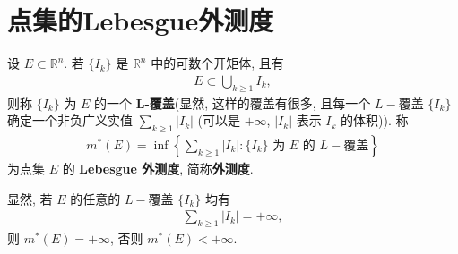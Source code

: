 \documentclass[../../main.tex]{subfiles}
\begin{document}
\section{点集的Lebesgue外测度}

\begin{definition}[Lebesgue外测度]
设 \(E \subset \mathbb{R}^n\). 若 \(\{I_k\}\) 是 \(\mathbb{R}^n\) 中的可数个开矩体, 且有
\begin{align*}
E \subset \bigcup_{k \geq 1} I_k,
\end{align*}
则称 \(\{I_k\}\) 为 \(E\) 的一个 \textbf{L-覆盖}(显然, 这样的覆盖有很多, 且每一个 \(L -\)覆盖 \(\{I_k\}\) 确定一个非负广义实值 \(\sum_{k \geq 1} |I_k|\) (可以是 \(+ \infty\), \(|I_k|\) 表示 \(I_k\) 的体积)). 称
\begin{align*}
m^*(E) = \inf \left\{ \sum_{k \geq 1} |I_k| : \{I_k\} \text{ 为 } E \text{ 的 } L-\text{覆盖} \right\}
\end{align*}
为点集 \(E\) 的 \textbf{Lebesgue 外测度}, 简称\textbf{外测度}.
\end{definition}
\begin{remark}
显然, 若 \(E\) 的任意的 \(L -\)覆盖 \(\{I_k\}\) 均有
\begin{align*}
\sum_{k \geq 1} |I_k| = + \infty,
\end{align*}
则 \(m^*(E) = + \infty\), 否则 \(m^*(E) < + \infty\). 
\end{remark}
\end{document}
